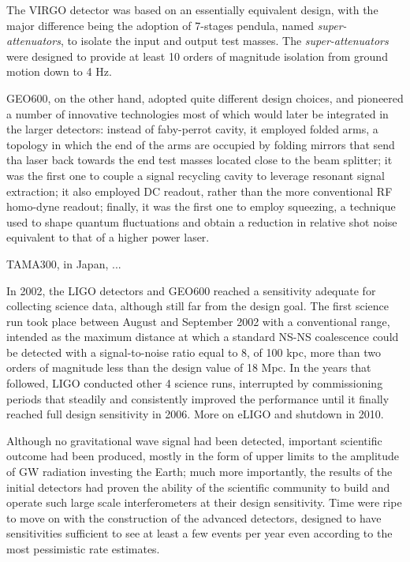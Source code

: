The VIRGO detector was based on an essentially equivalent design, with the major difference being the adoption of 7-stages pendula, named \textit{super-attenuators}, to isolate the input and output test masses. The \textit{super-attenuators} were designed to provide at least 10 orders of magnitude isolation from ground motion down to 4 Hz.

GEO600, on the other hand, adopted quite different design choices, and pioneered a number of innovative technologies most of which would later be integrated in the larger detectors: instead of faby-perrot cavity, it employed folded arms, a topology in which the end of the arms are occupied by folding mirrors that send tha laser back towards the end test masses located close to the beam splitter; it was the first one to couple a signal recycling cavity to leverage resonant signal extraction; it also employed DC readout, rather than the more conventional RF homo-dyne readout; finally, it was the first one to employ squeezing, a technique used to shape quantum fluctuations and obtain a reduction in relative shot noise equivalent to that of a higher power laser.

TAMA300, in Japan, ...

In 2002, the LIGO detectors and GEO600 reached a sensitivity adequate for collecting science data, although still far from the design goal. 
The first science run took place between August and September 2002 with a conventional range, intended as the maximum distance at which a standard NS-NS coalescence could be detected with a signal-to-noise ratio equal to 8, of 100 kpc, more than two orders of magnitude less than the design value of 18 Mpc. In the years that followed, LIGO conducted other 4 science runs, interrupted by commissioning periods that steadily and consistently improved the performance until it finally reached full design sensitivity in 2006. More on eLIGO and shutdown in 2010.

Although no gravitational wave signal had been detected, important scientific outcome had been produced, mostly in the form of upper limits to the amplitude of GW radiation investing the Earth; much more importantly, the results of the initial detectors had proven the ability of the scientific community to build and operate such large scale interferometers at their design sensitivity. Time were ripe to move on with the construction of the advanced detectors, designed to have sensitivities sufficient to see at least a few events per year even according to the most pessimistic rate estimates.

